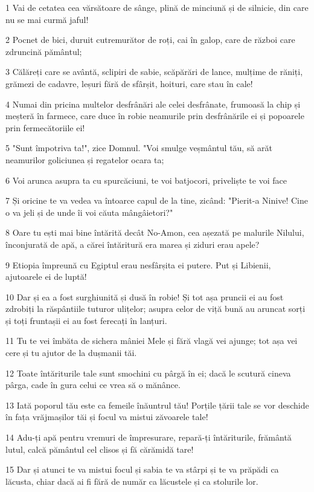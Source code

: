 \par 1 Vai de cetatea cea vărsătoare de sânge, plină de minciună și de silnicie, din care nu se mai curmă jaful!
\par 2 Pocnet de bici, duruit cutremurător de roți, cai în galop, care de război care zdruncină pământul;
\par 3 Călăreți care se avântă, sclipiri de sabie, scăpărări de lance, mulțime de răniți, grămezi de cadavre, leșuri fără de sfârșit, hoituri, care stau în cale!
\par 4 Numai din pricina multelor desfrânări ale celei desfrânate, frumoasă la chip și meșteră în farmece, care duce în robie neamurile prin desfrânările ei și popoarele prin fermecătoriile ei!
\par 5 "Sunt împotriva ta!", zice Domnul. "Voi smulge veșmântul tău, să arăt neamurilor goliciunea și regatelor ocara ta;
\par 6 Voi arunca asupra ta cu spurcăciuni, te voi batjocori, priveliște te voi face
\par 7 Și oricine te va vedea va întoarce capul de la tine, zicând: "Pierit-a Ninive! Cine o va jeli și de unde îi voi căuta mângâietori?"
\par 8 Oare tu ești mai bine întărită decât No-Amon, cea așezată pe malurile Nilului, înconjurată de apă, a cărei întăritură era marea și ziduri erau apele?
\par 9 Etiopia împreună cu Egiptul erau nesfârșita ei putere. Put și Libienii, ajutoarele ei de luptă!
\par 10 Dar și ea a fost surghiunită și dusă în robie! Și tot așa pruncii ei au fost zdrobiți la răspântiile tuturor ulițelor; asupra celor de viță bună au aruncat sorți și toți fruntașii ei au fost ferecați în lanțuri.
\par 11 Tu te vei îmbăta de sichera mâniei Mele și fără vlagă vei ajunge; tot așa vei cere și tu ajutor de la dușmanii tăi.
\par 12 Toate întăriturile tale sunt smochini cu pârgă în ei; dacă le scutură cineva pârga, cade în gura celui ce vrea să o mănânce.
\par 13 Iată poporul tău este ca femeile înăuntrul tău! Porțile țării tale se vor deschide în fața vrăjmașilor tăi și focul va mistui zăvoarele tale!
\par 14 Adu-ți apă pentru vremuri de împresurare, repară-ți întăriturile, frământă lutul, calcă pământul cel clisos și fă cărămidă tare!
\par 15 Dar și atunci te va mistui focul și sabia te va stârpi și te va prăpădi ca lăcusta, chiar dacă ai fi fără de număr ca lăcustele și ca stolurile lor.
